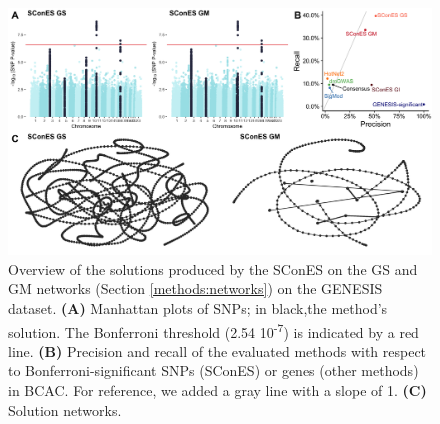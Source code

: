 \documentclass[draft,twocolumn, 11pt]{article}
\begin{document}
\begin{figure}[htbp]
  \centering
  \includegraphics[width=\linewidth]{./figures/sfigure_9.png}
  \caption{Overview of the solutions produced by the SConES on the GS and GM networks (Section \ref{methods:networks}) on the GENESIS dataset. \textbf{(A)} Manhattan plots of SNPs; in black,the method’s solution. The Bonferroni threshold (2.54 \texttimes{} 10\textsuperscript{-7}) is indicated by a red line. \textbf{(B)} Precision and recall of the evaluated methods with respect to Bonferroni-significant SNPs (SConES) or genes (other methods) in BCAC. For reference, we added a gray line with a slope of 1. \textbf{(C)} Solution networks.}
  \label{sfig:scones_gsm}
\end{figure}
\end{document}

